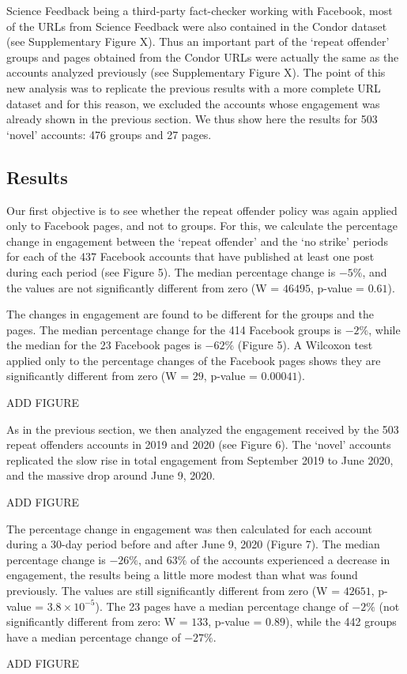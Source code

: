 \documentclass[review]{elsarticle}
\begin{document}
Science Feedback being a third-party fact-checker working with Facebook, most of the URLs from Science Feedback were also contained in the Condor dataset ({\color{red}see Supplementary Figure X}). 
Thus an important part of the `repeat offender' groups and pages obtained from the Condor URLs were actually the same as the accounts analyzed previously ({\color{red}see Supplementary Figure X}). 
The point of this new analysis was to replicate the previous results with a more complete URL dataset and for this reason, we excluded the accounts whose engagement was already shown in the previous section. 
We thus show here the results for 503 `novel' accounts: 476 groups and 27 pages.

\subsection{Results}

Our first objective is to see whether the repeat offender policy was again applied only to Facebook pages, and not to groups.
For this, we calculate the percentage change in engagement between the `repeat offender' and the `no strike' periods for each of the 437 Facebook accounts that have published at least one post during each period ({\color{red}see Figure 5}). 
The median percentage change is $-5\%$, and the values are not significantly different from zero (W = $46495$, p-value = $0.61$).

The changes in engagement are found to be different for the groups and the pages. 
The median percentage change for the 414 Facebook groups is $-2\%$, while the median for the 23 Facebook pages is $-62\%$ ({\color{red}Figure 5}). 
A Wilcoxon test applied only to the percentage changes of the Facebook pages shows they are significantly different from zero (W = $29$, p-value = $0.00041$).

{\color{red}ADD FIGURE}

As in the previous section, we then analyzed the engagement received by the 503 repeat offenders accounts in 2019 and 2020 ({\color{red}see Figure 6}). 
The `novel' accounts replicated the slow rise in total engagement from September 2019 to June 2020, and the massive drop around June 9, 2020.

{\color{red}ADD FIGURE}

The percentage change in engagement was then calculated for each account during a 30-day period before and after June 9, 2020 ({\color{red}Figure 7}).
The median percentage change is $-26\%$, and $63\%$ of the accounts experienced a decrease in engagement, the results being a little more modest than what was found previously.
The values are still significantly different from zero (W = $42651$, p-value = $3.8 \times 10^{-5}$).
The 23 pages have a median percentage change of $-2\%$ (not significantly different from zero: W = $133$, p-value = $0.89$), while the 442 groups have a median percentage change of $-27\%$.

{\color{red}ADD FIGURE}



\end{document}
